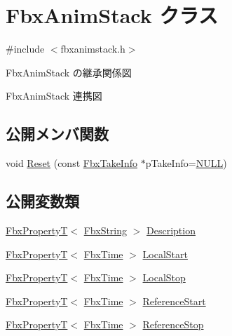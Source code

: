 \hypertarget{class_fbx_anim_stack}{}\section{Fbx\+Anim\+Stack クラス}
\label{class_fbx_anim_stack}


{\ttfamily \#include $<$fbxanimstack.\+h$>$}



Fbx\+Anim\+Stack の継承関係図


Fbx\+Anim\+Stack 連携図
\subsection*{公開メンバ関数}
\begin{DoxyCompactItemize}
\item 
void \hyperlink{class_fbx_anim_stack_a69f6d38a6b4fa348585674e5d68464b2}{Reset} (const \hyperlink{class_fbx_take_info}{Fbx\+Take\+Info} $\ast$p\+Take\+Info=\hyperlink{fbxarch_8h_a070d2ce7b6bb7e5c05602aa8c308d0c4}{N\+U\+LL})
\end{DoxyCompactItemize}
\subsection*{公開変数類}
\begin{DoxyCompactItemize}
\item 
\hyperlink{class_fbx_property_t}{Fbx\+PropertyT}$<$ \hyperlink{class_fbx_string}{Fbx\+String} $>$ \hyperlink{class_fbx_anim_stack_a87abfeabeaa31a44e2474f01d4501b7f}{Description}
\item 
\hyperlink{class_fbx_property_t}{Fbx\+PropertyT}$<$ \hyperlink{class_fbx_time}{Fbx\+Time} $>$ \hyperlink{class_fbx_anim_stack_a140ba636c0907144d60d2901c0995456}{Local\+Start}
\item 
\hyperlink{class_fbx_property_t}{Fbx\+PropertyT}$<$ \hyperlink{class_fbx_time}{Fbx\+Time} $>$ \hyperlink{class_fbx_anim_stack_a07be87cbd6b3226be489c69b5466a72d}{Local\+Stop}
\item 
\hyperlink{class_fbx_property_t}{Fbx\+PropertyT}$<$ \hyperlink{class_fbx_time}{Fbx\+Time} $>$ \hyperlink{class_fbx_anim_stack_adeac4e2557e00ccd420eb9b790377e22}{Reference\+Start}
\item 
\hyperlink{class_fbx_property_t}{Fbx\+PropertyT}$<$ \hyperlink{class_fbx_time}{Fbx\+Time} $>$ \hyperlink{class_fbx_anim_stack_a480a3b46ab895a740ee658e7022ec208}{Reference\+Stop}
\end{DoxyCompactItemize}

